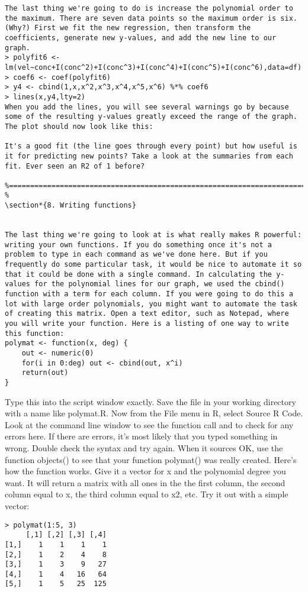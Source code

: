 {\begin{framed}
\begin{verbatim}
The last thing we're going to do is increase the polynomial order to the maximum. There are seven data points so the maximum order is six. (Why?) First we fit the new regression, then transform the coefficients, generate new y-values, and add the new line to our graph. 
> polyfit6 <- lm(vel~conc+I(conc^2)+I(conc^3)+I(conc^4)+I(conc^5)+I(conc^6),data=df)
> coef6 <- coef(polyfit6)
> y4 <- cbind(1,x,x^2,x^3,x^4,x^5,x^6) %*% coef6
> lines(x,y4,lty=2)
When you add the lines, you will see several warnings go by because some of the resulting y-values greatly exceed the range of the graph. The plot should now look like this: 

It's a good fit (the line goes through every point) but how useful is it for predicting new points? Take a look at the summaries from each fit. Ever seen an R2 of 1 before? 

%======================================================================================================== %
\section*{8. Writing functions}


The last thing we're going to look at is what really makes R powerful: writing your own functions. If you do something once it's not a problem to type in each command as we've done here. But if you frequently do some particular task, it would be nice to automate it so that it could be done with a single command. In calculating the y-values for the polynomial lines for our graph, we used the cbind() function with a term for each column. If you were going to do this a lot with large order polynomials, you might want to automate the task of creating this matrix. Open a text editor, such as Notepad, where you will write your function. Here is a listing of one way to write this function: 
polymat <- function(x, deg) {
    out <- numeric(0)
    for(i in 0:deg) out <- cbind(out, x^i)
    return(out)
}
\end{verbatim}
\end{framed}
Type this into the script window exactly. Save the file in your working directory with a name like polymat.R. Now from the File menu in R, select Source R Code. Look at the command line window to see the function call and to check for any errors here. If there are errors, it's most likely that you typed something in wrong. Double check the syntax and try again. When it sources OK, use the function objects() to see that your function polymat() was really created. Here's how the function works. Give it a vector for x and the polynomial degree you want. It will return a matrix with all ones in the the first column, the second column equal to x, the third column equal to x2, etc. Try it out with a simple vector: 
\begin{framed}
\begin{verbatim}
> polymat(1:5, 3)
     [,1] [,2] [,3] [,4] 
[1,]    1    1    1    1
[2,]    1    2    4    8
[3,]    1    3    9   27
[4,]    1    4   16   64
[5,]    1    5   25  125


\end{verbatim}
\end{framed}}
